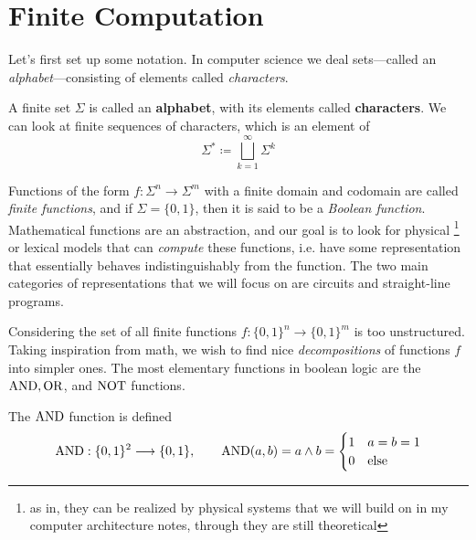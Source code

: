 \section{Finite Computation}

  Let's first set up some notation. In computer science we deal sets---called an \textit{alphabet}---consisting of elements called \textit{characters}.  

  \begin{definition}[Alphabet]
    A finite set $\Sigma$ is called an \textbf{alphabet}, with its elements called \textbf{characters}. We can look at finite sequences of characters, which is an element of 
    \begin{equation}
      \Sigma^\ast \coloneqq \bigsqcup_{k=1}^\infty \Sigma^k 
    \end{equation}
  \end{definition}

  Functions of the form $f: \Sigma^n \to \Sigma^m$ with a finite domain and codomain are called \textit{finite functions}, and if $\Sigma = \{0, 1\}$, then it is said to be a \textit{Boolean function}. Mathematical functions are an abstraction, and our goal is to look for physical \footnote{as in, they can be realized by physical systems that we will build on in my computer architecture notes, through they are still theoretical} or lexical models that can \textit{compute} these functions, i.e. have some representation that essentially behaves indistinguishably from the function. The two main categories of representations that we will focus on are circuits and straight-line programs. 

  \label{binary_motivation}
  Considering the set of all finite functions $f: \{0, 1\}^n \to \{0, 1\}^m$ is too unstructured. Taking inspiration from math, we wish to find nice \textit{decompositions} of functions $f$ into simpler ones. The most elementary functions in boolean logic are the $\AND, \OR$, and $\NOT$ functions.  

  \begin{definition}
    The $\AND$ function is defined 
    \begin{equation}
      \AND: \{0,1\}^2 \longrightarrow \{0,1\}, \qquad 
      \AND (a,b) = a \wedge b = \begin{cases}
        1 & a = b = 1 \\
        0 & \text{else}
      \end{cases}
    \end{equation}
  \end{definition}

